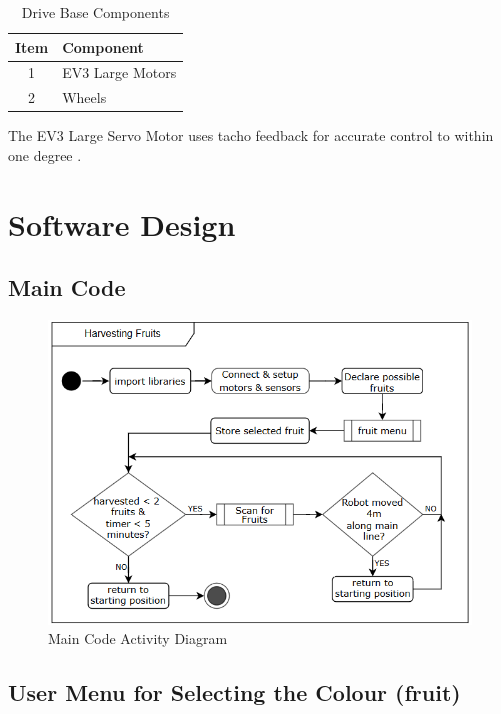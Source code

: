 \begin{table}[!ht]
	\centering
	\caption{Drive Base Components}
	\vspace{-2mm}
	\label{tab:DriveBaseComponents}
	\begin{tabular}{cl}
		\hline
		\textbf{Item}&\textbf{Component}\\
		\hline
		1&EV3 Large Motors\\
		2&Wheels\\
		\hline			
	\end{tabular}
\end{table}

\noindent The EV3 Large Servo Motor uses tacho feedback for accurate control to within one degree \cite{raisingRobots}. 

\newpage
\section{Software Design}\label{sec:softwareDesign}

\subsection{Main Code}\label{sec:mainCode}

\begin{figure}[!ht]
	\centering
	\includegraphics[width=\linewidth]{Graphics/mainCodeActivityDiagram2}
	\caption{Main Code Activity Diagram}
	\label{fig:MainCodeActivityDiagram}
\end{figure}

\newpage
\subsection{User Menu for Selecting the Colour (fruit)}\label{sec:menuCode}

